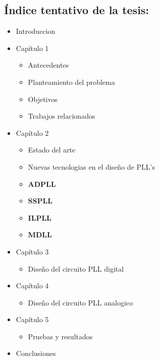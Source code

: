 \documentclass[runningheads,a4paper]{llncs}
\begin{document}
\subsection{Índice tentativo de la tesis:}
\begin{itemize}
\item Introduccion
\item Capítulo 1
\begin{itemize}
    \item Antecedentes
    \item Planteamiento del problema
    \item Objetivos
    \item Trabajos relacionados
\end{itemize}
\item Capítulo 2
\begin{itemize}
    \item Estado del arte
    \item Nuevas tecnologias en el diseño de PLL's
    \item \textbf{ADPLL}
    \item \textbf{SSPLL}
    \item \textbf{ILPLL}
    \item \textbf{MDLL}
\end{itemize}
\item Capítulo 3
\begin{itemize}
    \item Diseño del circuito PLL digital
\end{itemize}
\item Capítulo 4
\begin{itemize}
    \item Diseño del circuito PLL analogico
\end{itemize}
\item Capítulo 5
\begin{itemize}
    \item Pruebas y resultados
\end{itemize}
\item Conclusiones
\end{itemize}
\end{document}
